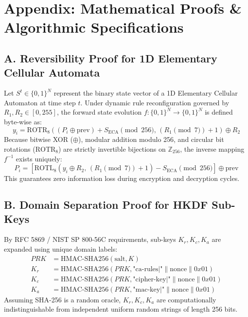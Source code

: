 \section*{Appendix: Mathematical Proofs \& Algorithmic Specifications}
\label{sec:appendix}

\subsection{A. Reversibility Proof for 1D Elementary Cellular Automata}
Let $S^t \in \{0, 1\}^N$ represent the binary state vector of a 1D Elementary Cellular Automaton at time step $t$. Under dynamic rule reconfiguration governed by $R_1, R_2 \in [0, 255]$, the forward state evolution $f: \{0,1\}^N \to \{0,1\}^N$ is defined byte-wise as:
\begin{equation}
y_i = \text{ROTR}_8 \left( (P_i \oplus \text{prev}) + S_{\text{ECA}} \pmod{256}, \, (R_1 \pmod 7) + 1 \right) \oplus R_2
\end{equation}
Because bitwise XOR ($\oplus$), modular addition modulo 256, and circular bit rotations ($\text{ROTR}_8$) are strictly invertible bijections on $\mathbb{Z}_{256}$, the inverse mapping $f^{-1}$ exists uniquely:
\begin{equation}
P_i = \left[ \text{ROTL}_8 (y_i \oplus R_2, \, (R_1 \pmod 7) + 1) - S_{\text{ECA}} \pmod{256} \right] \oplus \text{prev}
\end{equation}
This guarantees zero information loss during encryption and decryption cycles.

\subsection{B. Domain Separation Proof for HKDF Sub-Keys}
By RFC 5869 / NIST SP 800-56C requirements, sub-keys $K_r, K_c, K_a$ are expanded using unique domain labels:
\begin{align}
PRK &= \text{HMAC-SHA256}(\text{salt}, K) \\
K_r &= \text{HMAC-SHA256}(PRK, \text{"ca-rules|"} \parallel \text{nonce} \parallel 0x01) \\
K_c &= \text{HMAC-SHA256}(PRK, \text{"cipher-key|"} \parallel \text{nonce} \parallel 0x01) \\
K_a &= \text{HMAC-SHA256}(PRK, \text{"mac-key|"} \parallel \text{nonce} \parallel 0x01)
\end{align}
Assuming SHA-256 is a random oracle, $K_r, K_c, K_a$ are computationally indistinguishable from independent uniform random strings of length 256 bits.
